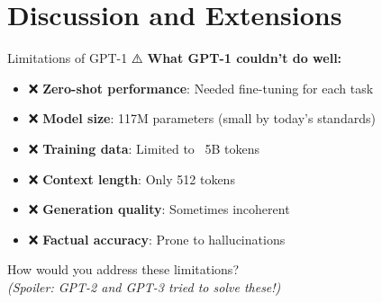 \documentclass[aspectratio=169]{beamer}
\begin{document}
\section{Discussion and Extensions}

\begin{frame}[shrink=10]{Limitations of GPT-1 ⚠️}
\small
    \textbf{What GPT-1 couldn't do well:}

    \vspace{0.3cm}

    \begin{itemize}\setlength{\itemsep}{0pt}
        \item ❌ \textbf{Zero-shot performance}: Needed fine-tuning for each task
        \item ❌ \textbf{Model size}: 117M parameters (small by today's standards)
        \item ❌ \textbf{Training data}: Limited to ~5B tokens
        \item ❌ \textbf{Context length}: Only 512 tokens
        \item ❌ \textbf{Generation quality}: Sometimes incoherent
        \item ❌ \textbf{Factual accuracy}: Prone to hallucinations
    \end{itemize}

    \vspace{0.3cm}

    \begin{discussion}
        How would you address these limitations? \\
        \vspace{0.2cm}
        \textit{(Spoiler: GPT-2 and GPT-3 tried to solve these!)}
    \end{discussion}
\end{frame}
\end{document}

